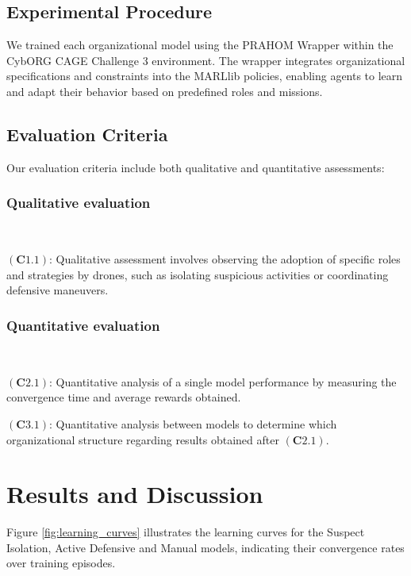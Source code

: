 \documentclass[conference]{IEEEtran}
\begin{document}
\subsection{Experimental Procedure}

We trained each organizational model using the PRAHOM Wrapper within the CybORG CAGE Challenge 3 environment. The wrapper integrates organizational specifications and constraints into the MARLlib policies, enabling agents to learn and adapt their behavior based on predefined roles and missions.

\subsection{Evaluation Criteria}

Our evaluation criteria include both qualitative and quantitative assessments:

\subsubsection{Qualitative evaluation}

\

$(\mathbf{C1.1})$: \quad Qualitative assessment involves observing the adoption of specific roles and strategies by drones, such as isolating suspicious activities or coordinating defensive maneuvers.

\subsubsection{Quantitative evaluation}

\

$(\mathbf{C2.1})$: \quad Quantitative analysis of a single model performance by measuring the convergence time and average rewards obtained.\

$(\mathbf{C3.1})$: \quad Quantitative analysis between  models to determine which organizational structure regarding results obtained after $(\mathbf{C2.1})$.



\section{Results and Discussion}\label{sec:results_and_discussion}

Figure \ref{fig:learning_curves} illustrates the learning curves for the Suspect Isolation, Active Defensive and Manual models, indicating their convergence rates over training episodes.
\end{document}
